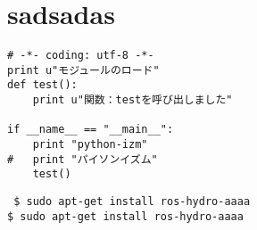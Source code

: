 \chapter{sadsadas}
\begin{lstlisting}[caption=キャプション,label=ラベル]
# -*- coding: utf-8 -*-
print u"モジュールのロード"
def test():
    print u"関数：testを呼び出しました"

if __name__ == "__main__":
    print "python-izm"
#   print "パイソンイズム"
    test()

\end{lstlisting}


\begin{shadebox}
{\tt
\$ sudo apt-get install ros-hydro-aaaa\\
\$ sudo apt-get install ros-hydro-aaaa
}
\end{shadebox}

